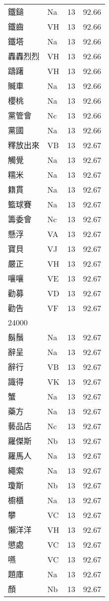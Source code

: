 \documentclass[twocolumn]{book}
\begin{document}
\begin{supertabular}{llrr}
鐵鎚 & Na & 13 &  92.66\\
鐵齒 & VH & 13 &  92.66\\
鐵塔 & Na & 13 &  92.66\\
轟轟烈烈 & VH & 13 &  92.66\\
躊躇 & VH & 13 &  92.66\\
贓車 & Na & 13 &  92.66\\
櫻桃 & Na & 13 &  92.66\\
黨管會 & Nc & 13 &  92.66\\
黨國 & Na & 13 &  92.66\\
釋放出來 & VB & 13 &  92.67\\
觸覺 & Na & 13 &  92.67\\
糯米 & Na & 13 &  92.67\\
籍貫 & Na & 13 &  92.67\\
籃球賽 & Na & 13 &  92.67\\
籌委會 & Nc & 13 &  92.67\\
懸浮 & VA & 13 &  92.67\\
寶貝 & VJ & 13 &  92.67\\
嚴正 & VH & 13 &  92.67\\
嚷嚷 & VE & 13 &  92.67\\
勸募 & VD & 13 &  92.67\\
勸告 & VF & 13 &  92.67\\
24000\\
鬍鬚 & Na & 13 &  92.67\\
辭呈 & Na & 13 &  92.67\\
辭行 & VB & 13 &  92.67\\
識得 & VK & 13 &  92.67\\
蟹 & Na & 13 &  92.67\\
藥方 & Na & 13 &  92.67\\
藝品店 & Nc & 13 &  92.67\\
羅傑斯 & Nb & 13 &  92.67\\
羅馬人 & Na & 13 &  92.67\\
繩索 & Na & 13 &  92.67\\
瓊斯 & Nb & 13 &  92.67\\
櫥櫃 & Na & 13 &  92.67\\
攀 & VC & 13 &  92.67\\
懶洋洋 & VH & 13 &  92.67\\
懲處 & VC & 13 &  92.67\\
嚥 & VC & 13 &  92.67\\
題庫 & Na & 13 &  92.67\\
顏 & Nb & 13 &  92.67\\

\end{supertabular}
\end{document}
